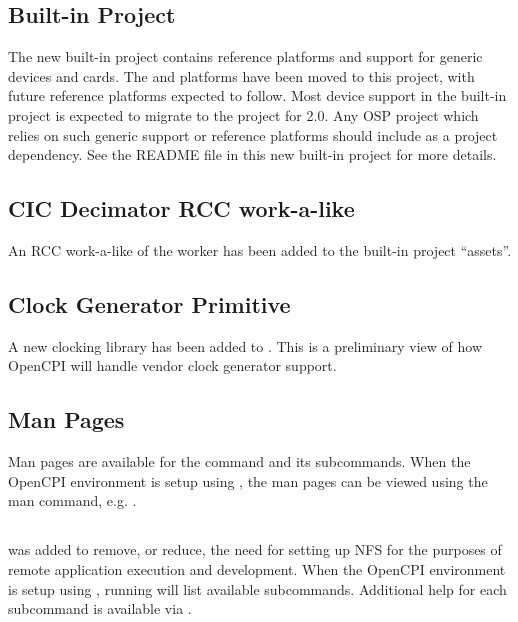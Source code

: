 \subsection{Built-in  Project}
\label{sec:17_platform_project}
The new built-in  project contains reference platforms and support for generic devices and cards. The  and  platforms have been moved to this project, with future reference platforms expected to follow. Most device support in the built-in  project is expected to migrate to the  project for 2.0. Any OSP project which relies on such generic support or reference platforms should include  as a project dependency. See the README file in this new built-in project for more details.

\subsection{CIC Decimator RCC work-a-like}
\label{sec17_cic_dec}
An RCC work-a-like of the  worker has been added to the built-in project ``assets''.

\subsection{Clock Generator Primitive}
\label{sec:17_clocking}
A new clocking library has been added to . This is a preliminary view of how OpenCPI will handle vendor clock generator support.

\subsection{Man Pages}
\label{sec:17_man_pages}
Man pages are available for the  command and its subcommands. When the OpenCPI environment is setup using , the man pages can be viewed using the man command, e.g. .

\subsection{}
\label{sec:17_ocpiremote}
 was added to remove, or reduce, the need for setting up NFS for the purposes of remote application execution and development. When the OpenCPI environment is setup using , running  will list available subcommands. Additional help for each subcommand is available via .

